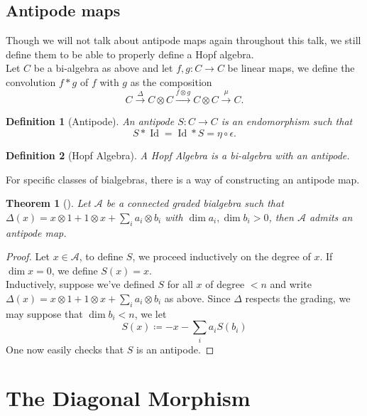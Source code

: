 \documentclass[11pt, a4paper]{article}
\DeclareMathOperator*{\id}{Id}
\newtheorem{thm}{Theorem}
\newtheorem{defn}{Definition}
\theoremstyle{plain}
\newtheorem*{proof}{Proof}
\begin{document}
\subsection{Antipode maps}
Though we will not talk about antipode maps again throughout this talk, we still define them to be able to properly define a Hopf algebra.\\
Let $C$ be a bi-algebra as above and let $f,g\colon C\to C$ be linear maps, we define the convolution $f\ast g$ of $f$ with $g$ as the composition
\[ 
	C \xrightarrow{\Delta} C\otimes C \xrightarrow{f\otimes g} C\otimes C \xrightarrow{\mu} C.
\]
\begin{defn}[Antipode]
	An antipode $S\colon C\to C$ is an endomorphism such that
	\[ 
	S\ast \id = \id\ast S = \eta\circ \epsilon.
	\]
\end{defn}
\begin{defn}[Hopf Algebra]
A Hopf Algebra is a bi-algebra with an antipode.
\end{defn}
For specific classes of bialgebras, there is a way of constructing an antipode map.
\begin{thm}[{{\cite[prop 8.2]{struct_of_hopf_alg_milnor}}}]
Let $\mathcal{A}$ be a connected graded bialgebra such that $\Delta( x) = x\otimes 1 + 1 \otimes x + \sum_i a_i \otimes b_i $ with $\dim a_i,\dim b_i >0$, then $\mathcal{A}$ admits an antipode map.
\end{thm}
\begin{proof}
Let $x \in \mathcal{A}$, to define $S$, we proceed inductively on the degree of $x$. If $\dim x = 0$, we define $S( x) = x$.\\
Inductively, suppose we've defined $S$ for all $x$ of degree $<n$ and write $\Delta( x) = x\otimes 1 + 1 \otimes x + \sum_i a_i \otimes b_i$ as above. Since $\Delta$ respects the grading, we may suppose that $\dim b_i <n$, we let
\[ 
S( x) \coloneq -x - \sum_i a_i S( b_i) 
\]
One now easily checks that $S$ is an antipode.
\end{proof}


\section{The Diagonal Morphism}
\end{document}
